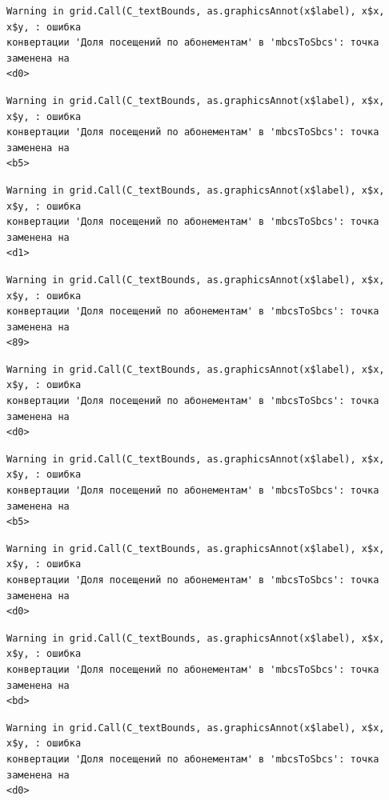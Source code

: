 \documentclass[
  letterpaper,
  DIV=11,
  numbers=noendperiod]{scrreprt}
\begin{document}
\begin{verbatim}
Warning in grid.Call(C_textBounds, as.graphicsAnnot(x$label), x$x, x$y, : ошибка
конвертации 'Доля посещений по абонементам' в 'mbcsToSbcs': точка заменена на
<d0>
\end{verbatim}

\begin{verbatim}
Warning in grid.Call(C_textBounds, as.graphicsAnnot(x$label), x$x, x$y, : ошибка
конвертации 'Доля посещений по абонементам' в 'mbcsToSbcs': точка заменена на
<b5>
\end{verbatim}

\begin{verbatim}
Warning in grid.Call(C_textBounds, as.graphicsAnnot(x$label), x$x, x$y, : ошибка
конвертации 'Доля посещений по абонементам' в 'mbcsToSbcs': точка заменена на
<d1>
\end{verbatim}

\begin{verbatim}
Warning in grid.Call(C_textBounds, as.graphicsAnnot(x$label), x$x, x$y, : ошибка
конвертации 'Доля посещений по абонементам' в 'mbcsToSbcs': точка заменена на
<89>
\end{verbatim}

\begin{verbatim}
Warning in grid.Call(C_textBounds, as.graphicsAnnot(x$label), x$x, x$y, : ошибка
конвертации 'Доля посещений по абонементам' в 'mbcsToSbcs': точка заменена на
<d0>
\end{verbatim}

\begin{verbatim}
Warning in grid.Call(C_textBounds, as.graphicsAnnot(x$label), x$x, x$y, : ошибка
конвертации 'Доля посещений по абонементам' в 'mbcsToSbcs': точка заменена на
<b5>
\end{verbatim}

\begin{verbatim}
Warning in grid.Call(C_textBounds, as.graphicsAnnot(x$label), x$x, x$y, : ошибка
конвертации 'Доля посещений по абонементам' в 'mbcsToSbcs': точка заменена на
<d0>
\end{verbatim}

\begin{verbatim}
Warning in grid.Call(C_textBounds, as.graphicsAnnot(x$label), x$x, x$y, : ошибка
конвертации 'Доля посещений по абонементам' в 'mbcsToSbcs': точка заменена на
<bd>
\end{verbatim}

\begin{verbatim}
Warning in grid.Call(C_textBounds, as.graphicsAnnot(x$label), x$x, x$y, : ошибка
конвертации 'Доля посещений по абонементам' в 'mbcsToSbcs': точка заменена на
<d0>
\end{verbatim}
\end{document}
